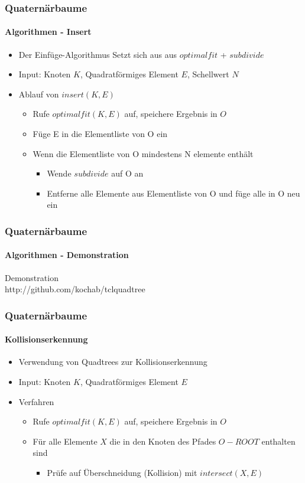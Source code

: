 \documentclass{beamer}
\begin{document}
\begin{frame}
  \frametitle{Quaternärbaume}
  \framesubtitle{Algorithmen - Insert}
  \begin{itemize}
    \item Der Einfüge-Algorithmus Setzt sich aus aus $optimalfit$ + $subdivide$
    \item Input: Knoten $K$, Quadratförmiges Element $E$, Schellwert $N$
    \item Ablauf von $insert(K,E)$
    \begin{itemize}
      \item Rufe $optimalfit(K,E)$ auf, speichere Ergebnis in $O$
      \item Füge E in die Elementliste von O ein
      \item Wenn die Elementliste von O mindestens N elemente enthält
      \begin{itemize}
        \item Wende $subdivide$ auf O an
        \item Entferne alle Elemente aus Elementliste von O und füge alle in O neu ein
      \end{itemize}
    \end{itemize}
  \end{itemize}
\end{frame}

\begin{frame}
  \frametitle{Quaternärbaume}
  \framesubtitle{Algorithmen - Demonstration}
  \begin{center}
    Demonstration \\
    \hfill\break
    http://github.com/kochab/tclquadtree
  \end{center}
\end{frame}

\begin{frame}
  \frametitle{Quaternärbaume}
  \framesubtitle{Kollisionserkennung}
  \begin{itemize}
    \item Verwendung von Quadtrees zur Kollisionserkennung
    \item Input: Knoten $K$, Quadratförmiges Element $E$
    \item Verfahren
    \begin{itemize}
      \item Rufe $optimalfit(K, E)$ auf, speichere Ergebnis in $O$
      \item Für alle Elemente $X$ die in den Knoten des Pfades $O - ROOT$ enthalten sind
      \begin{itemize}
        \item Prüfe auf Überschneidung (Kollision) mit $intersect(X,E)$
      \end{itemize}
    \end{itemize}
  \end{itemize}
\end{frame}
\end{document}
